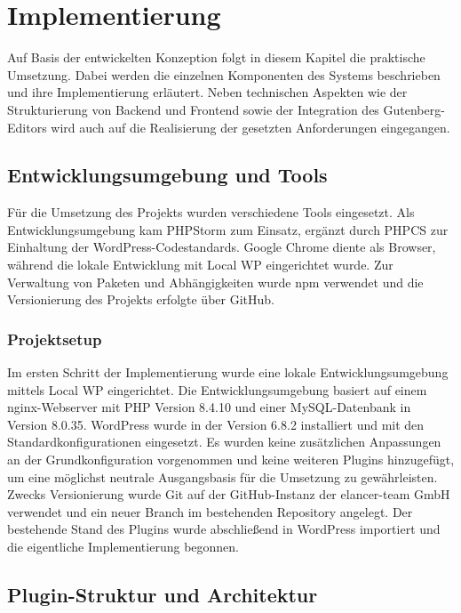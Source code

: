 \chapter{Implementierung}
\label{chap:implementation}

Auf Basis der entwickelten Konzeption folgt in diesem Kapitel die praktische Umsetzung.
Dabei werden die einzelnen Komponenten des Systems beschrieben und ihre Implementierung erläutert.
Neben technischen Aspekten wie der Strukturierung von Backend und Frontend sowie der Integration des Gutenberg-Editors wird auch auf die Realisierung der gesetzten Anforderungen eingegangen.

\section{Entwicklungsumgebung und Tools}

Für die Umsetzung des Projekts wurden verschiedene Tools eingesetzt.
Als Entwicklungsumgebung kam PHPStorm zum Einsatz, ergänzt durch PHPCS zur Einhaltung der WordPress-Codestandards.
Google Chrome diente als Browser, während die lokale Entwicklung mit Local WP eingerichtet wurde.
Zur Verwaltung von Paketen und Abhängigkeiten wurde npm verwendet und die Versionierung des Projekts erfolgte über GitHub.

\subsection{Projektsetup}

Im ersten Schritt der Implementierung wurde eine lokale Entwicklungsumgebung mittels Local WP eingerichtet.
Die Entwicklungsumgebung basiert auf einem nginx-Webserver mit PHP Version 8.4.10 und einer MySQL-Datenbank in Version 8.0.35.
WordPress wurde in der Version 6.8.2 installiert und mit den Standardkonfigurationen eingesetzt.
Es wurden keine zusätzlichen Anpassungen an der Grundkonfiguration vorgenommen und keine weiteren Plugins hinzugefügt, um eine möglichst neutrale Ausgangsbasis für die Umsetzung zu gewährleisten.
Zwecks Versionierung wurde Git auf der GitHub-Instanz der elancer-team GmbH verwendet und ein neuer Branch im bestehenden Repository angelegt.
Der bestehende Stand des Plugins wurde abschließend in WordPress importiert und die eigentliche Implementierung begonnen.

\section{Plugin-Struktur und Architektur}

